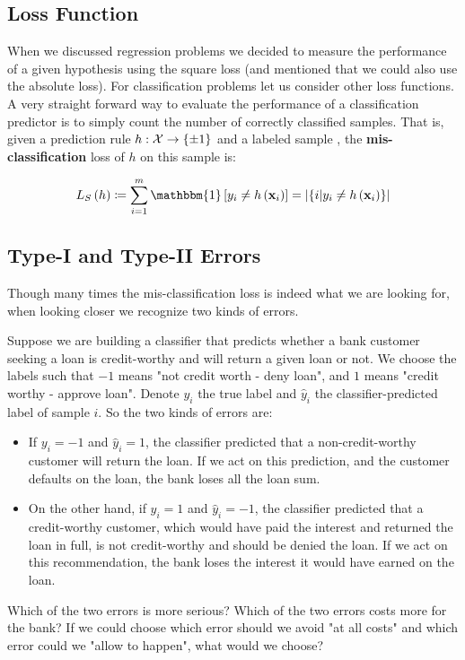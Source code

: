 \subsection{Loss Function}
When we discussed regression problems we decided to measure the performance of a given hypothesis using the square loss (and mentioned that we could also use the absolute loss). For classification problems let us consider other loss functions. A very straight forward way to evaluate the performance of a classification predictor is to simply count the number of correctly classified samples. That is, given a prediction rule $h:\mathcal{X}\rightarrow \left\{\pm 1\right\}$ and a labeled sample \trainset, the \textbf{mis-classification} loss of $h$ on this sample is:

\begin{equation}
L_S\left(h\right)\coloneqq\sum^{m}_{i=1}\mathbbm{1}\left[y_i\neq h\left(\x_i\right)\right]=\left|\left\{i|y_i\neq h\left(\x_i\right)\right\}\right|
\label{eqn:misclass_loss}
\end{equation}

\subsection{Type-I and Type-II Errors}\label{error_types}
Though many times the mis-classification loss is indeed what we are looking for, when looking closer we recognize two kinds of errors.

\begin{example}
	Suppose we are building a classifier that predicts whether a bank customer seeking a loan is credit-worthy and will return a given loan or not. We choose the labels such that $-1$ means "not credit worth - deny loan", and $1$ means "credit worthy - approve loan". Denote $y_i$ the true label and $\widehat{y}_i$ the classifier-predicted label of sample $i$. So the two kinds of errors are:
	\begin{itemize}
		\item If $y_i=-1$ and $\widehat{y}_i=1$, the classifier predicted that a non-credit-worthy customer will return the loan. If we act on this prediction, and the customer defaults on the loan, the bank loses all the loan sum.
		\item On the other hand, if $y_i=1$ and $\widehat{y}_i=-1$, the classifier predicted that a credit-worthy customer, which would have paid the interest and returned the loan in full, is not credit-worthy and should be denied the loan. If we act on this recommendation, the bank loses the interest it would have earned on the loan.
	\end{itemize}
	Which of the two errors is more serious? Which of the two errors costs more for the bank? If we could choose which error should we avoid "at all costs" and which error could we "allow to happen", what would we choose?
\end{example}

